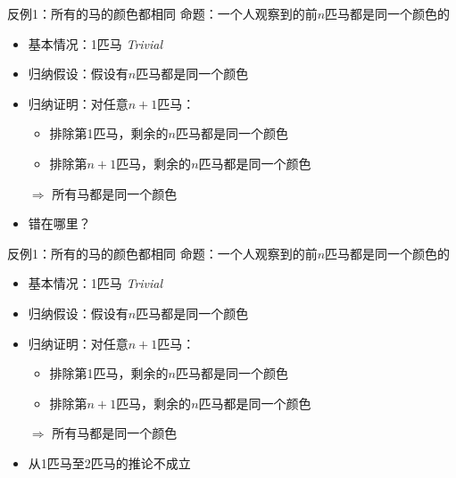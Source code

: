 \documentclass[]{beamer}
\begin{document}
\begin{frame}{反例1：所有的马的颜色都相同}
    \hspace{2em} 命题：一个人观察到的前$n$匹马都是同一个颜色的
    \begin{itemize}
        \item 基本情况：1匹马 \textit{Trivial}
        \item 归纳假设：假设有$n$匹马都是同一个颜色
        \item 归纳证明：对任意$n+1$匹马：
        \begin{itemize}
            \item 排除第1匹马，剩余的$n$匹马都是同一个颜色
            \item 排除第$n+1$匹马，剩余的$n$匹马都是同一个颜色
        \end{itemize}
        $\Rightarrow$ 所有马都是同一个颜色 
        \item 错在哪里？
    \end{itemize}
\end{frame}


\begin{frame}{反例1：所有的马的颜色都相同}
    \hspace{2em} 命题：一个人观察到的前$n$匹马都是同一个颜色的
    \begin{itemize}
        \item 基本情况：1匹马 \textit{Trivial}
        \item 归纳假设：假设有$n$匹马都是同一个颜色
        \item 归纳证明：对任意$n+1$匹马：
        \begin{itemize}
            \item 排除第1匹马，剩余的$n$匹马都是同一个颜色
            \item 排除第$n+1$匹马，剩余的$n$匹马都是同一个颜色
        \end{itemize}
        $\Rightarrow$ 所有马都是同一个颜色 
        \item 从1匹马至2匹马的推论不成立
    \end{itemize}
\end{frame}
\end{document}
